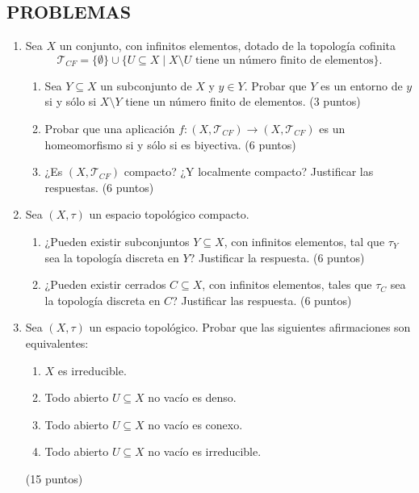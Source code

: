 \subsection*{PROBLEMAS}
\begin{enumerate}
    \item Sea $X$ un conjunto, con infinitos elementos, dotado de la topología cofinita 
    \[
    \mathcal{T}_{CF} = \{\emptyset\} \cup \{U \subseteq X \mid X \setminus U \text{ tiene un número finito de elementos}\}.
    \]
    \begin{enumerate}[label=(\alph*)]
        \item Sea $Y \subseteq X$ un subconjunto de $X$ y $y \in Y$. Probar que $Y$ es un entorno de $y$ si y sólo si $X \setminus Y$ tiene un número finito de elementos. \hfill (3 puntos)
        \item Probar que una aplicación $f: (X, \mathcal{T}_{CF}) \to (X, \mathcal{T}_{CF})$ es un homeomorfismo si y sólo si es biyectiva. \hfill (6 puntos)
        \item ¿Es $(X, \mathcal{T}_{CF})$ compacto? ¿Y localmente compacto? Justificar las respuestas. \hfill (6 puntos)
    \end{enumerate}

    \item Sea $(X, \tau)$ un espacio topológico compacto.
    \begin{enumerate}[label=(\alph*)]
        \item ¿Pueden existir subconjuntos $Y \subseteq X$, con infinitos elementos, tal que $\tau_Y$ sea la topología discreta en $Y$? Justificar la respuesta. \hfill (6 puntos)
        \item ¿Pueden existir cerrados $C \subseteq X$, con infinitos elementos, tales que $\tau_C$ sea la topología discreta en $C$? Justificar las respuesta. \hfill (6 puntos)
    \end{enumerate}

    \item Sea $(X, \tau)$ un espacio topológico. Probar que las siguientes afirmaciones son equivalentes:
    \begin{enumerate}[label=(\alph*)]
        \item $X$ es irreducible.
        \item Todo abierto $U \subseteq X$ no vacío es denso.
        \item Todo abierto $U \subseteq X$ no vacío es conexo.
        \item Todo abierto $U \subseteq X$ no vacío es irreducible.
    \end{enumerate} \hfill (15 puntos)
\end{enumerate}

